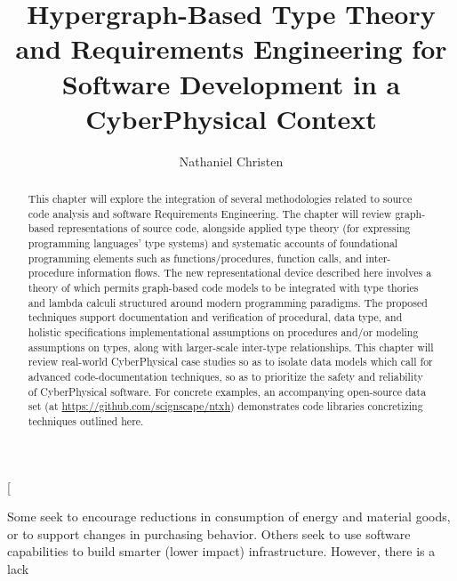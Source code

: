 \documentclass[11pt,twocolumn]{article}
\begin{document}
\title{Hypergraph-Based Type Theory and Requirements Engineering 
for Software Development in a CyberPhysical Context}
\author[1]{Nathaniel Christen}
\twocolumn[\begin{@twocolumnfalse}
\maketitle{}
\begin{abstract}This chapter will explore the integration of several methodologies 
related to source code analysis and software Requirements 
Engineering.  The chapter will review 
graph-based representations of source code, 
alongside applied type theory (for expressing 
programming languages' type systems) and 
systematic accounts of foundational programming 
elements such as functions/procedures, function calls, and 
inter-procedure information flows.  The new 
representational device described here involves a theory 
of  which permits  
graph-based code models to be integrated with type thories 
and lambda calculi structured around modern 
programming paradigms.   
The proposed techniques support documentation and 
verification of procedural, data type, and holistic 
specifications \mdash{} implementational assumptions on procedures  
and/or modeling assumptions on types, along with 
larger-scale inter-type relationships.  
This chapter will review real-world CyberPhysical case studies 
so as to isolate data models which call for advanced 
code-documentation techniques, so as to prioritize 
the safety and reliability of CyberPhysical software.    
For concrete examples, an accompanying open-source data set (at
\url{https://github.com/scignscape/ntxh}) 
demonstrates code libraries concretizing 
techniques outlined here.
\end{abstract} 
\newsavebox{\qboxii}
\begin{lrbox}{\qboxii}
\begin{frquote}Some seek to encourage reductions in consumption of energy
and  material  goods,  or  to  support  changes  in  purchasing
behavior.  Others  seek  to  use  software  capabilities  to  build
smarter (lower impact) infrastructure. However, there is a lack

\end{frquote}
\end{lrbox}
\end{@twocolumnfalse}
\end{document}
